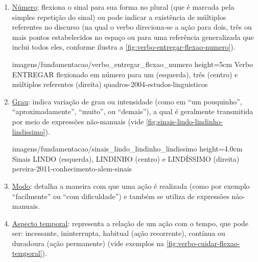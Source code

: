 \begin{enumerate}
\begin{enumerate}
            {imagens/fundamentacao/verbo_entregar_deixis} %
            {height=5cm} %
            {Verbo ENTREGAR flexionado entre as pessoas EU e VOCÊ (esquerda) e ELE 1 e ELE 2 (direita)} %
            {quadros-2004-estudos-linguisticos} %

        
        \item \underline{Número}: flexiona o sinal para sua forma no plural (que é marcada pela simples repetição do sinal) ou pode indicar a existência de múltiplos referentes no discurso (na qual o verbo direciona-se a ação para dois, três ou mais pontos estabelecidos no espaço ou para uma referência generalizada que inclui todos eles, conforme ilustra a \autoref{fig:verbo-entregar-flexao-numero}).

            {imagens/fundamentacao/verbo_entregar_flexao_numero} %
            {height=5cm} %
            {Verbo ENTREGAR flexionado em número para um (esquerda), três (centro) e múltiplos referentes (direita)} %
            {quadros-2004-estudos-linguisticos} %


        \item \underline{Grau}: indica variação de grau ou intensidade (como em ``um pouquinho'', ``aproximadamente'', ``muito'', ou ``demais''), a qual é geralmente transmitida por meio de expressões não-manuais (vide \autoref{fig:sinais-lindo-lindinho-lindissimo}).
    
            {imagens/fundamentacao/sinais_lindo_lindinho_lindissimo} %
            {height=4.0cm} %
            {Sinais LINDO (esquerda), LINDINHO (centro) e LINDÍSSIMO (direita)} %
            {pereira-2011-conhecimento-alem-sinais} %


        \item \underline{Modo}: detalha a maneira com que uma ação é realizada (como por exemplo ``facilmente'' ou ``com dificuldade'') e também se utiliza de expressões não-manuais.

        
        \item \underline{Aspecto temporal}: representa a relação de um ação com o tempo, que pode ser: incessante, ininterrupta, habitual (ação recorrente), contínua ou duradoura (ação permanente) (vide exemplos na \autoref{fig:verbo-cuidar-flexao-temporal}).


\end{enumerate}
\end{enumerate}
